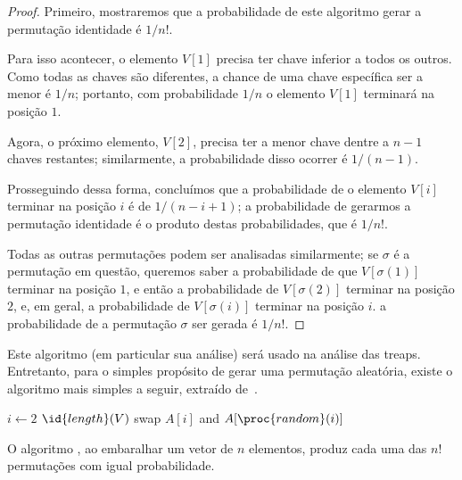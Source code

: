 \begin{proof}
    Primeiro, mostraremos que a probabilidade de este algoritmo
    gerar a permutação identidade é $1/n!$.

    Para isso acontecer,
    o elemento $V[1]$ precisa ter chave inferior a todos os outros.
    Como todas as chaves são diferentes,
    a chance de uma chave específica ser a menor é $1/n$;
    portanto, com probabilidade $1/n$ o elemento $V[1]$ terminará na posição $1$.

    Agora, o próximo elemento, $V[2]$,
    precisa ter a menor chave dentre a $n-1$ chaves restantes;
    similarmente, a probabilidade disso ocorrer é $1/(n-1)$.

    Prosseguindo dessa forma,
    concluímos que a probabilidade de o elemento $V[i]$ terminar na posição $i$
    é de $1/(n-i+1)$;
    a probabilidade de gerarmos a permutação identidade
    é o produto destas probabilidades, que é $1/n!$.

    Todas as outras permutações podem ser analisadas similarmente;
    se $\sigma$ é a permutação em questão,
    queremos saber a probabilidade de que $V[\sigma(1)]$ terminar na posição $1$,
    e então a probabilidade de $V[\sigma(2)]$ terminar na posição $2$,
    e, em geral, a probabilidade de $V[\sigma(i)]$ terminar na posição $i$.
    a probabilidade de a permutação $\sigma$ ser gerada é $1/n!$.
\end{proof}

Este algoritmo
(em particular sua análise)
será usado na análise das treaps.
Entretanto, para o simples propósito de gerar uma permutação aleatória,
existe o algoritmo mais simples a seguir,
extraído de~\cite[p.~357]{SedgewickFlajolet2013}.

\begin{codebox}
    \li \For $i \gets 2$ \To $\id{length}(V)$
    \li \Do
            swap $A[i]$ and $A[\proc{random}(i)]$
    \End
\end{codebox}

\begin{proposition}
    O algoritmo ,
    ao embaralhar um vetor de $n$ elementos,
    produz cada uma das $n!$ permutações
    com igual probabilidade.
\end{proposition}

